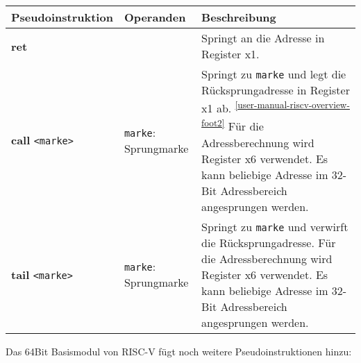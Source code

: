 \begin{tabular}{p{4.8cm} p{5.0cm} p{5.0cm}}

  \textbf{Pseudoinstruktion} & \textbf{Operanden} & \textbf{Beschreibung}\\
  \toprule

	\textbf{ret} & & Springt an die Adresse in Register x1.\footnotemark \\



	\textbf{call} \texttt{<marke>} & \textbullet \texttt{marke}: Sprungmarke & Springt zu \texttt{marke} und legt die Rücksprungadresse in Register x1 ab. \textsuperscript{\ref{user-manual-riscv-overview-foot2}} Für die Adressberechnung wird Register x6 verwendet. Es kann beliebige Adresse im 32-Bit Adressbereich angesprungen werden.\\



	\textbf{tail} \texttt{<marke>} & \textbullet \texttt{marke}: Sprungmarke & Springt zu \texttt{marke} und verwirft die Rücksprungadresse. Für die Adressberechnung wird Register x6 verwendet. Es kann beliebige Adresse im 32-Bit Adressbereich angesprungen werden.\\


\end{tabular}


Das 64Bit Basismodul von RISC-V fügt noch weitere Pseudoinstruktionen hinzu:\\

